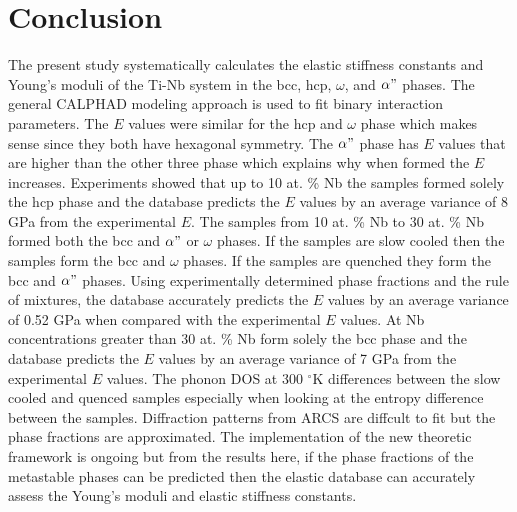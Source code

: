 \section{Conclusion}

The present study systematically calculates the elastic stiffness constants and Young's moduli of the Ti-Nb system in the bcc, hcp, $\omega$, and $\alpha"$ phases. The general CALPHAD modeling approach is used to fit binary interaction parameters. The $E$ values were similar for the hcp and $\omega$ phase which makes sense since they both have hexagonal symmetry. The $\alpha"$ phase has $E$ values that are higher than the other three phase which explains why when formed the $E$ increases. Experiments showed that up to 10 at. \% Nb the samples formed solely the hcp phase and the database predicts the $E$ values by an average variance of 8 GPa from the experimental $E$. The samples from 10 at. \% Nb to 30 at. \% Nb formed both the bcc and $\alpha"$ or $\omega$ phases. If the samples are slow cooled then the samples form the bcc and $\omega$ phases. If the samples are quenched they form the bcc and $\alpha"$ phases. Using experimentally determined phase fractions and the rule of mixtures, the database accurately predicts the $E$ values by an average variance of 0.52 GPa when compared with the experimental $E$ values. At Nb concentrations greater than 30 at. \% Nb form solely the bcc phase and the database predicts the $E$ values by an average variance of 7 GPa from the experimental $E$ values. The phonon DOS at 300 $^\circ$K differences between the slow cooled and quenced samples especially when looking at the entropy difference between the samples. Diffraction patterns from ARCS are diffcult to fit but the phase fractions are approximated. The implementation of the new theoretic framework is ongoing but from the results here, if the phase fractions of the metastable phases can be predicted then the elastic database can accurately assess the Young's moduli and elastic stiffness constants. 

